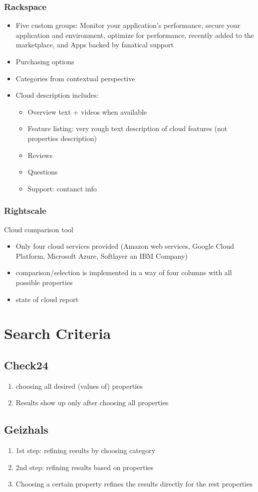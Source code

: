		\subsubsection {Rackspace}
			\begin{itemize}
				\item {Five custom groups: Monitor your application's performance, secure your application and environment, optimize for performance, recently added to the marketplace, and Apps backed by fanatical support}
				\item {Purchasing options}
				\item {Categories from contextual perspective}
				\item {Cloud description includes: }
				\begin{itemize}
					\item {Overview text + videos when available}
					\item {Feature listing: very rough text description of cloud features (not properties description)}
					\item {Reviews}
					\item {Questions}
					\item {Support: contanct info}
				\end{itemize}
			\end{itemize}
		\subsubsection {Rightscale}
			Cloud comparison tool 
			\begin{itemize}
				\item {Only four cloud services provided (Amazon web services, Google Cloud Platform, Microsoft Azure, Softlayer an IBM Company)}
				\item {comparison/selection is implemented in a way of four columns with all possible properties}
				\item {state of cloud report}
			\end{itemize}
\section {Search Criteria}
	\subsection {Check24}
		\begin{enumerate}
			\item {choosing all desired (values of) properties}
			\item {Results show up only after choosing all properties}
		\end{enumerate}
	\subsection {Geizhals}
		\begin{enumerate}
			\item {1st step: refining results by choosing category}
			\item {2nd step: refining results based on properties}
			\item {Choosing a certain property refines the results directly for the rest properties}
		\end{enumerate}